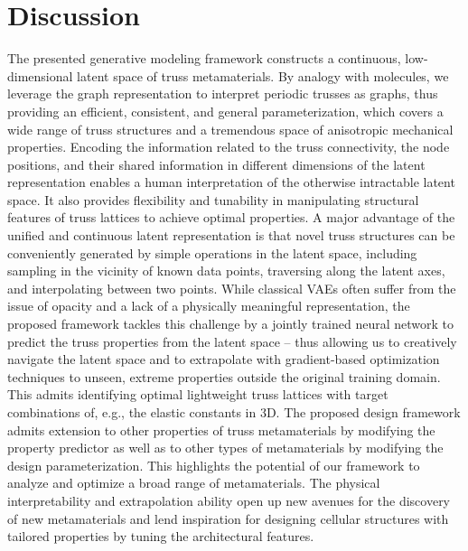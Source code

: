 \documentclass[fleqn,10pt]{wlscirep}
\begin{document}
 \section*{Discussion}
 
The presented generative modeling framework constructs a continuous, low-dimensional latent space of truss metamaterials. By analogy with molecules, we leverage the graph representation to interpret periodic trusses as graphs, thus providing an efficient, consistent, and general parameterization, which covers a wide range of truss structures and a tremendous space of anisotropic mechanical properties. Encoding the information related to the truss connectivity, the node positions, and their shared information in different dimensions of the latent representation enables a human interpretation of the otherwise intractable latent space. It also provides flexibility and tunability in manipulating structural features of truss lattices to achieve optimal properties. A major advantage of the unified and continuous latent representation is that novel truss structures can be conveniently generated by simple operations in the latent space, including sampling in the vicinity of known data points, traversing along the latent axes, and interpolating between two points. While classical VAEs often suffer from the issue of opacity and a lack of a physically meaningful representation, the proposed framework tackles this challenge by a jointly trained neural network to predict the truss properties from the latent space -- thus allowing us to creatively navigate the latent space and to extrapolate with gradient-based optimization techniques to unseen, extreme properties outside the original training domain. This admits identifying optimal lightweight truss lattices with target combinations of, e.g., the elastic constants in 3D.
The proposed design framework admits extension to other properties of truss metamaterials\cite{wilt2020accelerating,challapalli2021inverse,maurizi2022inverse} by modifying the property predictor as well as to other types of metamaterials\cite{vlassis2020geometric, yamaguchi2022graph, kollmann2020deep, chen2022see,kumar2020inverse,alderete2022machine} by modifying the design parameterization. This highlights the potential of our framework to analyze and optimize a broad range of metamaterials. The physical interpretability and extrapolation ability open up new avenues for the discovery of new metamaterials and lend inspiration for designing cellular structures with tailored properties by tuning the architectural features.
\end{document}
